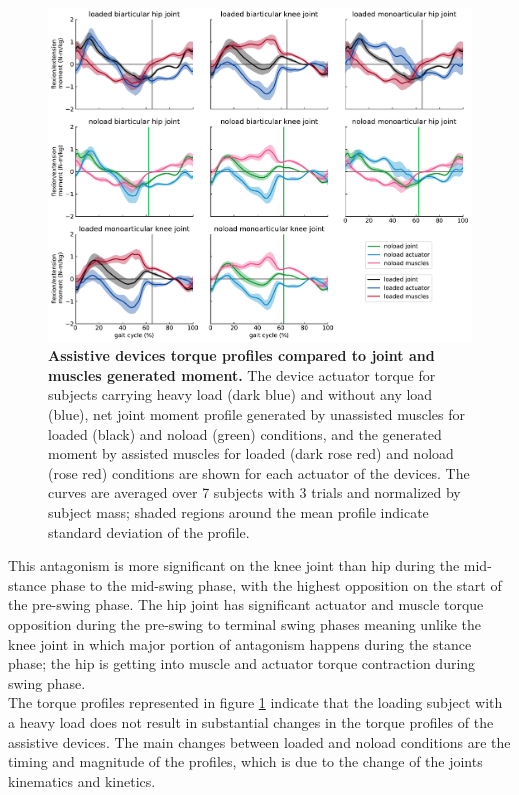 \documentclass[10pt,letterpaper]{article}
\begin{document}
\begin{figure}[ht]   
	\centering
	\includegraphics[width=\linewidth]{Ideal_Exo_MonovsBi_Figures/PaperFigure_Exoskeletons_Torque.pdf}
	\vspace{1mm}
	\caption{{\small\textbf{Assistive devices torque profiles compared to joint and muscles generated moment.} The device actuator torque for subjects carrying heavy load (dark blue) and without any load (blue), net joint moment profile generated by unassisted muscles for loaded (black) and noload (green) conditions, and the generated moment by assisted muscles for loaded (dark rose red) and noload (rose red) conditions are shown for each actuator of the devices. The curves are averaged over 7 subjects with 3 trials and normalized by subject mass; shaded regions around the mean profile indicate standard deviation of the profile.}}
	\label{Fig_IdealExo_Torque}
\end{figure}
This antagonism is more significant on the knee joint than hip during the mid-stance phase to the mid-swing phase, with the highest opposition on the start of the pre-swing phase. The hip joint has significant actuator and muscle torque opposition during the pre-swing to terminal swing phases meaning unlike the knee joint in which major portion of antagonism happens during the stance phase; the hip is getting into muscle and actuator torque contraction during swing phase. \\
The torque profiles represented in figure \ref{Fig_IdealExo_Torque} indicate that the loading subject with a heavy load does not result in substantial changes in the torque profiles of the assistive devices. The main changes between loaded and noload conditions are the timing and magnitude of the profiles, which is due to the change of the joints kinematics and kinetics.
\end{document}
